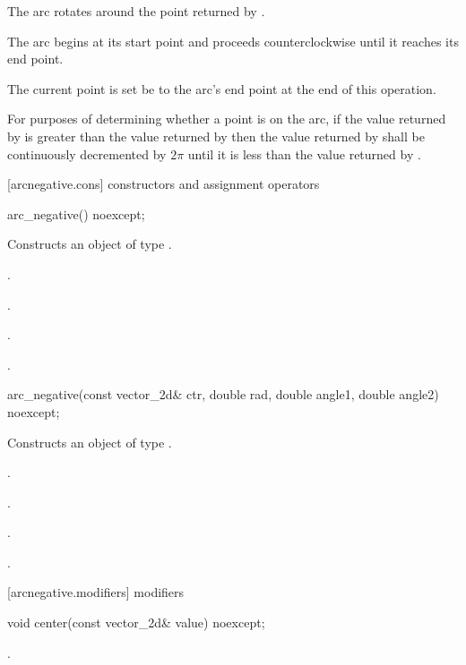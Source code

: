\pnum
The arc rotates around the point returned by .

\pnum
The arc begins at its start point and proceeds counterclockwise until it reaches its end point.

\pnum
The current point is set be to the arc's end point at the end of this operation.

\pnum
For purposes of determining whether a point is on the arc, if the value returned by  is greater than the value returned by  then the value returned by  shall be continuously decremented by $2\pi$ until it is less than the value returned by .

 [arcnegative.cons] { constructors and assignment operators}

\begin{itemdecl}
    arc_negative() noexcept;
\end{itemdecl}
\begin{itemdescr}
	\pnum
	\effects
	Constructs an object of type .
	
	\pnum
	\postconditions
	.

	.

	.

	.

\end{itemdescr}

\begin{itemdecl}
    arc_negative(const vector_2d& ctr, double rad, double angle1,
      double angle2) noexcept;
\end{itemdecl}
\begin{itemdescr}
	\pnum
	\effects
	Constructs an object of type .
	
	\pnum
	\postconditions
	.

	.

	.

	.

\end{itemdescr}

 [arcnegative.modifiers]{ modifiers}

\begin{itemdecl}
    void center(const vector_2d& value) noexcept;
\end{itemdecl}
\begin{itemdescr}
	\pnum
	\postconditions
	.
	
\end{itemdescr}

